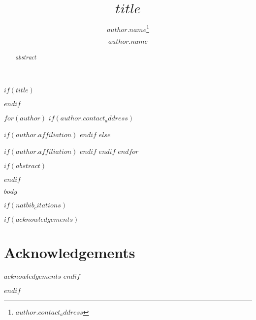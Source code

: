 \documentclass[$CL_style$]{clv3}
\begin{document}
$if(title)$
  \title{$title$}
$endif$

$for(author)$
  $if(author.contact_address)$
    \author{$author.name$\thanks{$author.contact_address$}}
    $if(author.affiliation)$
    $endif$
  $else$
    \author{$author.name$}
    $if(author.affiliation)$
    $endif$
  $endif$
$endfor$

\maketitle

$if(abstract)$
\begin{abstract}
$abstract$
\end{abstract}
$endif$

$body$

$if(natbib_citations)$
\begin{multicols}{2}

$if(acknowledgements)$
\section*{Acknowledgements}\label{acknowledgements}
$acknowledgements$
$endif$



\end{multicols}
$endif$

\end{document}

